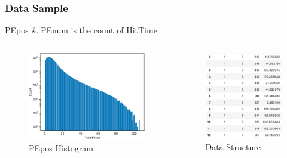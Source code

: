 \documentclass{beamer}
\begin{document}
\begin{frame}
\frametitle{Data Sample}
PEpos \& PEnum is the count of HitTime
\begin{columns}
\begin{figure}
    \centering
    \caption{PEpos Histogram}
    \includegraphics[width=1.0\linewidth]{img/pepos.png}
\end{figure}
\begin{figure}
    \centering
    \caption{Data Structure}
    \includegraphics[width=1.0\linewidth]{img/dataset.png}
\end{figure}
\end{columns}
\end{frame}
\end{document}
